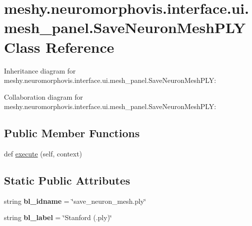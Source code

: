 \hypertarget{classmeshy_1_1neuromorphovis_1_1interface_1_1ui_1_1mesh__panel_1_1SaveNeuronMeshPLY}{}\section{meshy.\+neuromorphovis.\+interface.\+ui.\+mesh\+\_\+panel.\+Save\+Neuron\+Mesh\+P\+LY Class Reference}
\label{classmeshy_1_1neuromorphovis_1_1interface_1_1ui_1_1mesh__panel_1_1SaveNeuronMeshPLY}


Inheritance diagram for meshy.\+neuromorphovis.\+interface.\+ui.\+mesh\+\_\+panel.\+Save\+Neuron\+Mesh\+P\+LY\+:


Collaboration diagram for meshy.\+neuromorphovis.\+interface.\+ui.\+mesh\+\_\+panel.\+Save\+Neuron\+Mesh\+P\+LY\+:
\subsection*{Public Member Functions}
\begin{DoxyCompactItemize}
\item 
def \hyperlink{classmeshy_1_1neuromorphovis_1_1interface_1_1ui_1_1mesh__panel_1_1SaveNeuronMeshPLY_a225a2338a0fb6f25f0641594803553cb}{execute} (self, context)
\end{DoxyCompactItemize}
\subsection*{Static Public Attributes}
\begin{DoxyCompactItemize}
\item 
string {\bfseries bl\+\_\+idname} = \char`\"{}save\+\_\+neuron\+\_\+mesh.\+ply\char`\"{}\hypertarget{classmeshy_1_1neuromorphovis_1_1interface_1_1ui_1_1mesh__panel_1_1SaveNeuronMeshPLY_a9e8cf29664c5e4440675789ded9115f7}{}\label{classmeshy_1_1neuromorphovis_1_1interface_1_1ui_1_1mesh__panel_1_1SaveNeuronMeshPLY_a9e8cf29664c5e4440675789ded9115f7}

\item 
string {\bfseries bl\+\_\+label} = \char`\"{}Stanford (.ply)\char`\"{}\hypertarget{classmeshy_1_1neuromorphovis_1_1interface_1_1ui_1_1mesh__panel_1_1SaveNeuronMeshPLY_aeaa58bca955e37fd13b1f19cda701823}{}\label{classmeshy_1_1neuromorphovis_1_1interface_1_1ui_1_1mesh__panel_1_1SaveNeuronMeshPLY_aeaa58bca955e37fd13b1f19cda701823}

\end{DoxyCompactItemize}


